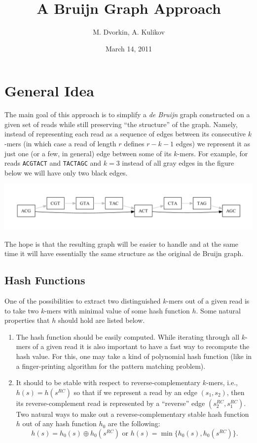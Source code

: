\documentclass[12pt]{article}
\begin{document}
\author{M. Dvorkin, A. Kulikov}
\title{A Bruijn Graph Approach}
\date{March 14, 2011}
\maketitle

\section{General Idea}

The main goal of this approach is to simplify a \emph{de Bruijn} graph
constructed on a given set of reads while still preserving 
``the structure'' of the graph. Namely, instead 
of representing each read as a sequence of edges 
between its consecutive $k$-mers (in which case a read of length $r$ defines
$r-k-1$ edges) we represent it as just one (or a few, in general)
edge between some of its $k$-mers. For example, for 
reads {\tt ACGTACT} and {\tt TACTAGC} and $k=3$
instead of all gray edges in the figure below we will have 
only two black edges.
\begin{center}
\includegraphics[width=\textwidth]{fig1.pdf}
\end{center}
The hope is that the resulting graph will be easier to handle 
and at the same time it will have essentially the same structure 
as the original de Bruijn graph.

\subsection{Hash Functions}

One of the possibilities to extract two distinguished $k$-mers out of a given
read is to take two $k$-mers with minimal value of some hash function $h$.
Some natural properties that $h$ should hold are listed below.
\begin{enumerate}
  \item The hash function should be easily computed.
  While iterating through all $k$-mers of a given read
  it is also important to have a fast way to recompute 
  the hash value. For this, one may take a kind of polynomial
  hash function (like in a finger-printing algorithm for the pattern 
  matching problem).
  \item It should to be stable with respect to reverse-complementary 
  $k$-mers, i.e., $h(s) = h(s^{RC})$ so that if we represent a read
  by an edge $(s_1,s_2)$, then its reverse-complement read is represented by 
  a ``reverse'' edge $(s_2^{RC},s_1^{RC})$. Two natural ways to make out a
  reverse-complementary stable hash function $h$ out of any hash function 
  $h_0$ are the following:
  \[h(s) = h_0(s) \oplus h_0(s^{RC}) \textrm{ or } h(s) = \min\{h_0(s), h_0(s^{RC})\} .\]
\end{enumerate}
\end{document}
